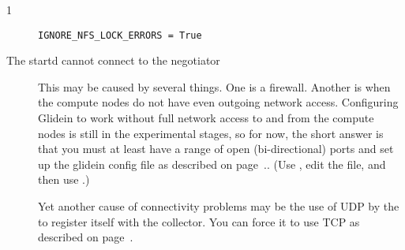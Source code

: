 \begin{ManPage}{\label{man-condor-glidein}}{1}
\begin{description}
\begin{verbatim}
IGNORE_NFS_LOCK_ERRORS = True
\end{verbatim}

\item[The startd cannot connect to the negotiator] This may be caused
by several things.  One is a firewall.  Another is when the compute
nodes do not have even outgoing network access.  Configuring Glidein
to work without full network access to and from the compute nodes is
still in the experimental stages, so for now, the short answer is that
you must at least have a range of open (bi-directional) ports and set
up the glidein config file as described on
page~\pageref{param:HighPort}..  (Use , edit the file,
and then use .)

Yet another cause of connectivity problems may be the use of UDP by
the  to register itself with the collector.  You can
force it to use TCP as described on
page~\pageref{param:UpdateCollectorWithTcp}.

\end{description}

\end{ManPage}
